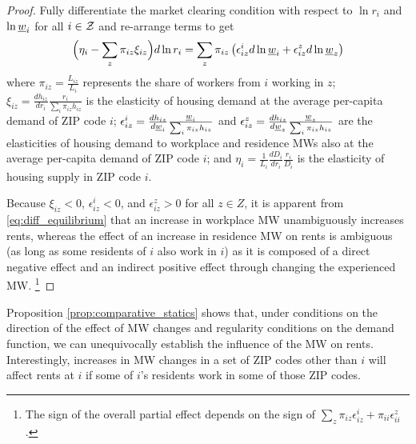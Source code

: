 \begin{proof}
    Fully differentiate the market clearing condition with respect to $\ln r_i$ and 
    $\ln \underline{w}_i$ for all $i\in\mathcal{Z}$ and re-arrange terms to get
    \begin{equation}\label{eq:diff_equilibrium}
        \Big(\eta_i - \sum_z \pi_{iz} \xi_{iz} \Big) d \ln r_i
        = 
        \sum_z \pi_{iz} \left(\epsilon_{iz}^i d \ln \underline{w}_i 
                            + \epsilon_{iz}^z d \ln \underline{w}_z \right)
    \end{equation}
    where 
    $\pi_{iz} = \frac{L_{iz}}{L_i}$ represents the share of workers from $i$ working 
    in	$z$;
    $\xi_{iz} = \frac{d h_{iz}}{d r_i} \frac{r_i}{\sum_i \pi_{iz} h_{iz}}$ is the 
    elasticity of housing demand at the average per-capita demand of ZIP code $i$;
    $\epsilon_{iz}^i = \frac{d h_{iz}}{d \underline{w}_i} \frac{\underline{w}_i}{\sum_i \pi_{iz} h_{iz}}$ and 
    $\epsilon_{iz}^z = \frac{d h_{iz}}{d \underline{w}_z} \frac{\underline{w}_z}{\sum_i \pi_{iz} h_{iz}}$ 
    are the elasticities of housing demand to workplace and residence MWs also at 
    the average per-capita demand of ZIP code $i$; and
    $\eta_i = \frac{1}{L_i} \frac{d D_i}{d r_i} \frac{r_i}{D_i}$ is the elasticity 
    of housing supply in ZIP code $i$.
    

    Because $\xi_{iz} < 0$, $\epsilon_{iz}^i < 0$, and $\epsilon_{iz}^z > 0$ for 
    all $z\in Z$, it is apparent from \eqref{eq:diff_equilibrium} that an increase 
    in workplace MW unambiguously increases rents, whereas the effect of an increase in 
    residence MW on rents is ambiguous (as long as some residents of $i$ also work in $i$) 
    as it is composed of a direct negative effect and an indirect positive effect 
    through changing the experienced MW.%
    \footnote{The sign of the overall partial effect depends on the sign of 
    $\sum_z \pi_{iz} \epsilon_{iz}^i + \pi_{ii} \epsilon_{ii}^z$.} 
\end{proof}

Proposition \ref{prop:comparative_statics} shows that, under conditions on the 
direction of the effect of MW changes and regularity conditions on the demand 
function, we can unequivocally establish the influence of the MW on rents. 
Interestingly, increases in MW changes in a set of ZIP codes other than $i$
will affect rents at $i$ if some of $i$'s residents work in some of those ZIP codes.

